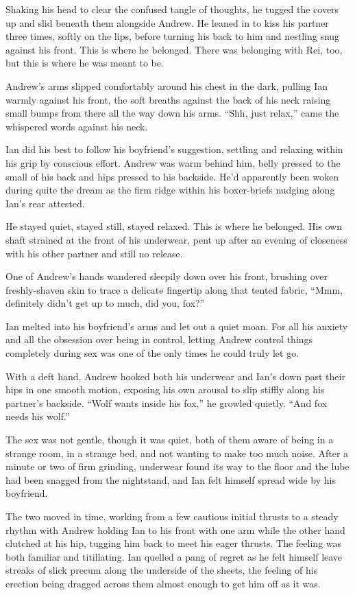 Shaking his head to clear the confused tangle of thoughts, he tugged the covers up and slid beneath them alongside Andrew. He leaned in to kiss his partner three times, softly on the lips, before turning his back to him and nestling snug against his front. This is where he belonged. There was belonging with Rei, too, but this is where he was meant to be.

Andrew's arms slipped comfortably around his chest in the dark, pulling Ian warmly against his front, the soft breaths against the back of his neck raising small bumps from there all the way down his arms. ``Shh, just relax,'' came the whispered words against his neck.

Ian did his best to follow his boyfriend's suggestion, settling and relaxing within his grip by conscious effort. Andrew was warm behind him, belly pressed to the small of his back and hips pressed to his backside. He'd apparently been woken during quite the dream as the firm ridge within his boxer-briefs nudging along Ian's rear attested.

He stayed quiet, stayed still, stayed relaxed. This is where he belonged. His own shaft strained at the front of his underwear, pent up after an evening of closeness with his other partner and still no release.

One of Andrew's hands wandered sleepily down over his front, brushing over freshly-shaven skin to trace a delicate fingertip along that tented fabric, ``Mmm, definitely didn't get up to much, did you, fox?''

Ian melted into his boyfriend's arms and let out a quiet moan. For all his anxiety and all the obsession over being in control, letting Andrew control things completely during sex was one of the only times he could truly let go.

With a deft hand, Andrew hooked both his underwear and Ian's down past their hips in one smooth motion, exposing his own arousal to slip stiffly along his partner's backside. ``Wolf wants inside his fox,'' he growled quietly. ``And fox needs his wolf.''

The sex was not gentle, though it was quiet, both of them aware of being in a strange room, in a strange bed, and not wanting to make too much noise. After a minute or two of firm grinding, underwear found its way to the floor and the lube had been snagged from the nightstand, and Ian felt himself spread wide by his boyfriend.

The two moved in time, working from a few cautious initial thrusts to a steady rhythm with Andrew holding Ian to his front with one arm while the other hand clutched at his hip, tugging him back to meet his eager thrusts. The feeling was both familiar and titillating. Ian quelled a pang of regret as he felt himself leave streaks of slick precum along the underside of the sheets, the feeling of his erection being dragged across them almost enough to get him off as it was.

